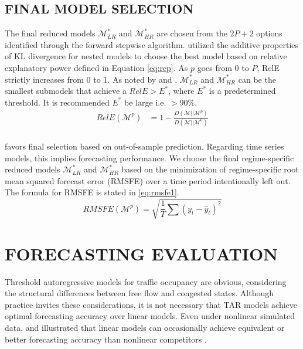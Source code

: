 \subsection{FINAL MODEL SELECTION}
The final reduced models $\mathcal{M}^*_{LR}$ and $\mathcal{M}^*_{HR}$ are chosen from the $2P+2$ options identified through the forward stepwise algorithm. \cite{Dupuis2003} utilized the additive properties of KL divergence for nested models to choose the best model based on relative explanatory power defined in Equation \ref{eq:rep}. As $p$ goes from $0$ to $P$, RelE strictly increases from 0 to 1. As noted by \cite{Dupuis2003} and \cite{Piironen2017}, $\mathcal{M}^*_{LR}$ and $\mathcal{M}^*_{HR}$ can be the smallest submodels that achieve a $RelE > E^*$, where $E^*$ is a predetermined threshold. It is recommended $E^*$ be large i.e. $>90\%$.
\begin{equation}
\label{eq:rep}
\begin{split}
RelE(\mathcal{M}^p)&=1-\frac{D(\mathcal{M}||\mathcal{M}^p)}{D(\mathcal{M}||\mathcal{M}^0)}\\
\end{split}
\end{equation}

\cite{Piironen2015,Piironen2017} favors final selection based on out-of-sample prediction. Regarding time series models, this implies forecasting performance. We choose the final regime-specific reduced models $\mathcal{M}^*_{LR}$ and $\mathcal{M}^*_{HR}$ based on the minimization of  regime-specific root mean squared forecast error (RMSFE) over a time period intentionally left out. The formula for RMSFE is stated in \ref{eq:rmsfe1}.
\begin{equation}
 	\label{eq:rmsfe1}
  RMSFE(\mathcal{M}^p)=\sqrt{\frac{1}{T}\sum (y_t-\hat{y}_t)^2}
\end{equation}










\section{FORECASTING EVALUATION}
Threshold autoregressive models for traffic occupancy are obvious, considering the structural differences between free flow and congested states. Although practice invites these considerations, it is not necessary that TAR models achieve optimal forecasting accuracy over linear models. Even under nonlinear simulated data, \cite{Davies1988} and \cite{Pemberton1989} illustrated that linear models can occasionally achieve equivalent or better forecasting accuracy than nonlinear competitors \citep{Guo1997,Stock1998a,Dacco1999}.

